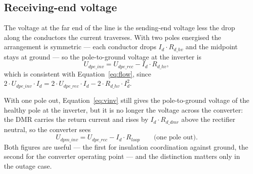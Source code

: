 \subsection{Receiving-end voltage}
The voltage at the far end of the line is the sending-end voltage less the drop
along the conductors the current traverses. With two poles energised the
arrangement is symmetric --- each conductor drops $I_{d}\cdot R_{d\_hv}$ and the
midpoint stays at ground --- so the pole-to-ground voltage at the inverter is
\begin{equation}
  U_{dpe\_inv} = U_{dpe\_rec} - I_{d}\cdot R_{d\_hv},
  \label{eq:vinv}
\end{equation}
which is consistent with Equation~\eqref{eq:flow}, since
$2\cdot U_{dpe\_inv}\cdot I_{d} = 2\cdot U_{dpe\_rec}\cdot I_{d} - 2\cdot R_{d\_hv}\cdot I_{d}^{2}$.

With one pole out, Equation~\eqref{eq:vinv} still gives the pole-to-ground
voltage of the healthy pole at the inverter, but it is no longer the voltage
across the converter: the DMR carries the return current and rises by
$I_{d}\cdot R_{d\_dmr}$ above the rectifier neutral, so the converter sees
\begin{equation}
  U_{dpm\_inv} = U_{dpe\_rec} - I_{d}\cdot R_{loop}
  \qquad\text{(one pole out).}
  \label{eq:vinvmono}
\end{equation}
Both figures are useful --- the first for insulation coordination against
ground, the second for the converter operating point --- and the distinction
matters only in the outage case.
